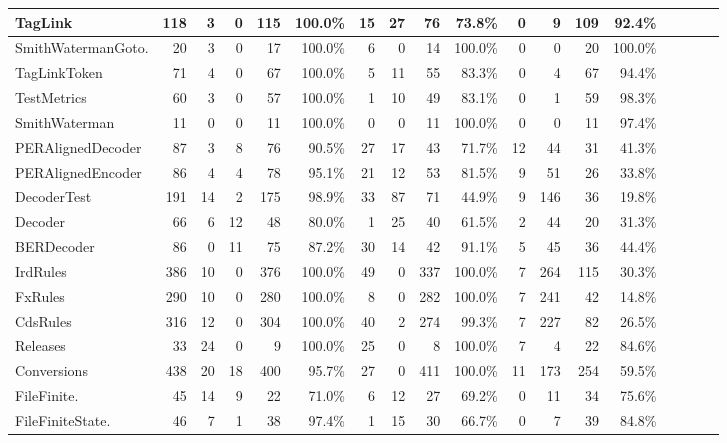 \begin{table*}[t]
\begin{SmallOut}
\begin {tabular} {|l|r|r|r|r|r|r|r|r|r|r|r|r|r|r|r|r|r|}
\hline\hline
  TagLink                      & 118 & 3    & 0  & 115 & 100.0\%& 15 & 27 & 76  & 73.8\% & 0  & 9 & 109  & 92.4\%\\
\hline
SmithWatermanGoto.& 20 & 3    &  0 & 17  & 100.0\%& 6  & 0  &  14 & 100.0\%& 0  & 0 & 20   & 100.0\%\\
\hline
  TagLinkToken                  & 71 & 4    & 0  & 67  & 100.0\%& 5  & 11 &  55 & 83.3\% & 0  & 4 & 67   & 94.4\%\\
\hline
  TestMetrics                   & 60 & 3    & 0  & 57  & 100.0\%& 1  & 10 & 49  & 83.1\% & 0  & 1 & 59   & 98.3\%\\
\hline
  SmithWaterman                 & 11 & 0    & 0  & 11  & 100.0\%& 0  & 0  & 11  & 100.0\%& 0  & 0 & 11  & 97.4\%\\
\hline\hline
  PERAlignedDecoder & 87   & 3  & 8  & 76  & 90.5\% & 27 & 17 & 43  & 71.7\% & 12 & 44 & 31  & 41.3\%\\
\hline
  PERAlignedEncoder & 86   & 4  & 4  & 78  & 95.1\% & 21 & 12 & 53  & 81.5\% & 9  & 51 & 26  & 33.8\%\\
\hline
  DecoderTest       & 191  & 14 &  2 & 175 & 98.9\% & 33 & 87 & 71  & 44.9\% & 9  & 146& 36  & 19.8\%\\
\hline
  Decoder           & 66   & 6  & 12 & 48  & 80.0\% & 1  & 25 & 40  & 61.5\% & 2  & 44 & 20  & 31.3\%\\
\hline
  BERDecoder        & 86   & 0  & 11 & 75  & 87.2\% & 30 & 14 & 42  & 91.1\% & 5  & 45 & 36  & 44.4\%\\
\hline\hline
  IrdRules          & 386  & 10 & 0  & 376 & 100.0\%& 49 & 0  & 337 & 100.0\%& 7  & 264 & 115 & 30.3\%\\
\hline
  FxRules           & 290  & 10 & 0  & 280 & 100.0\%& 8  & 0  & 282 & 100.0\%& 7  & 241 & 42  & 14.8\%\\
\hline
  CdsRules          & 316  & 12 & 0  & 304 & 100.0\%& 40 & 2  & 274 & 99.3\% & 7  & 227 & 82  & 26.5\%\\
\hline
  Releases          & 33   & 24 & 0  & 9   & 100.0\%& 25 & 0  & 8   & 100.0\%& 7  & 4   & 22  & 84.6\%\\
\hline
  Conversions       & 438  & 20 & 18 & 400 & 95.7\% & 27 & 0  & 411 & 100.0\%& 11 & 173 & 254 & 59.5\%\\
\hline\hline
FileFinite.    & 45   & 14  & 9  & 22  & 71.0\% & 6   & 12 & 27  & 69.2\% & 0  & 11& 34   & 75.6\%\\
\hline
FileFiniteState.& 46   & 7  & 1   & 38  & 97.4\% & 1   & 15 & 30  & 66.7\% & 0  & 7 & 39   & 84.8\%\\

\end{tabular}
\end{SmallOut}
\end{table*}
